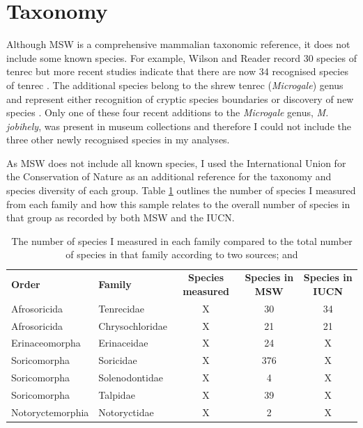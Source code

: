 \section{Taxonomy}

Although MSW is a comprehensive mammalian taxonomic reference, it does not include some known species. For example, Wilson and Reader \citeyearpar{Wilson2005} record 30 species of tenrec but more recent studies indicate that there are now 34 recognised species of tenrec \citep{Olson2013}. The additional species belong to the shrew tenrec (\textit{Microgale}) genus and represent either recognition of cryptic species boundaries \citep{Olson2004} or discovery of new species \citep{Goodman2006, Olson2009}. Only one of these four recent additions to the \textit{Microgale} genus, \textit{M. jobihely}, was present in museum collections and therefore I could not include the three other newly recognised species in my analyses.

As MSW does not include all known species, I used the International Union for the Conservation of Nature \citep{IUCN2012} as an additional reference for the taxonomy and species diversity of each group. Table \ref{tab:species.measured} outlines the number of species I measured from each family and how this sample relates to the overall number of species in that group as recorded by both MSW and the IUCN.


\begin{table}[h]
\caption[Summary of species measured] %
{The number of species I measured in each family compared to the total number of species in that family according to two sources; \citep{Wilson2005} and \citep{IUCN2012}}
\begin{tabular}{llccc}
\textbf{Order} & \textbf{Family} & \textbf{Species measured} & \textbf{Species in MSW} & \textbf{Species in IUCN} \\
Afrosoricida & Tenrecidae & X & 30 & 34\\
Afrosoricida & Chrysochloridae & X & 21 & 21\\
Erinaceomorpha & Erinaceidae & X & 24 & X\\
Soricomorpha & Soricidae & X & 376 & X\\
Soricomorpha & Solenodontidae & X & 4 & X\\
Soricomorpha & Talpidae & X & 39 & X\\
Notoryctemorphia & Notoryctidae & X & 2 & X\\
\end{tabular}
\label{tab:species.measured}
\end{table}

